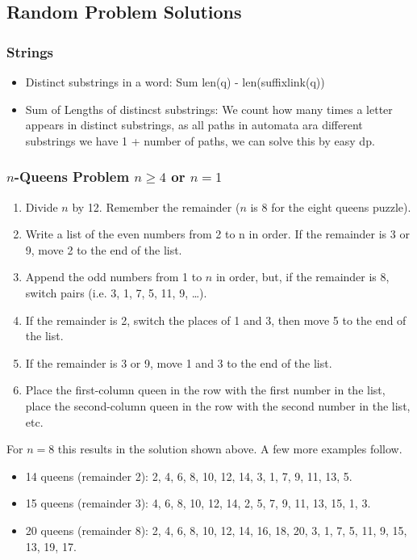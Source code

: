\subsection{Random Problem Solutions}
\subsubsection{Strings}
\begin{itemize}
\item Distinct substrings in a word: Sum len(q) - len(suffixlink(q))
\item Sum of Lengths of distincst substrings: We count how many times a letter appears in distinct substrings, as all paths in automata ara different substrings we have 1 + number of paths, we can solve this by easy dp.
\end{itemize}
\subsubsection{$n$-Queens Problem $n\geq 4$ or $n=1$}
\begin{enumerate}
\item Divide $n$ by 12. Remember the remainder ($n$ is 8 for the eight queens puzzle).
\item Write a list of the even numbers from 2 to n in order. If the remainder is 3 or 9, move 2 to the end of the list.
\item Append the odd numbers from 1 to $n$ in order, but, if the remainder is 8, switch pairs (i.e. 3, 1, 7, 5, 11, 9, \ldots).
\item If the remainder is 2, switch the places of 1 and 3, then move 5 to the end of the list.
\item If the remainder is 3 or 9, move 1 and 3 to the end of the list.
\item Place the first-column queen in the row with the first number in the list,  place the second-column queen in the row with the second number in the list, etc.
\end{enumerate}
For $n = 8$ this results in the solution shown above. A few more examples follow.
\begin{itemize}
\item 14 queens (remainder 2): 2, 4, 6, 8, 10, 12, 14, 3, 1, 7, 9, 11, 13, 5.
\item 15 queens (remainder 3): 4, 6, 8, 10, 12, 14, 2, 5, 7, 9, 11, 13, 15, 1, 3.
\item 20 queens (remainder 8): 2, 4, 6, 8, 10, 12, 14, 16, 18, 20, 3, 1, 7, 5, 11, 9, 15, 13, 19, 17.
\end{itemize}
